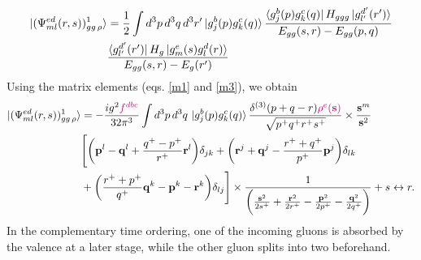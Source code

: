 \documentclass[a4paper,11pt]{article}
\def\v#1{\mathbf{#1}}
\begin{document}
\begin{figure}[htbp]
    \centering
\end{figure}
\begin{align}
\ket{(\Psi^{ed}_{ml}(r,s))^{1}_{gg\,\rho}} & = \frac{1}{2}\int d^{3}p\, d^{3}q\, d^{3}r^{\prime} \ket{g^{b}_{j}(p)g^{c}_{k}(q)}\frac{\bra{g^{b}_{j}(p)g^{c}_{k}(q)}H_{ggg}\ket{g^{d^{\prime}}_{l^{\prime}}(r^{\prime})}}{E_{gg}(s,r)-E_{gg}(p,q)}\notag \\ & \frac{\bra{g^{d^{\prime}}_{l^{\prime}}(r^{\prime})}H_{g}\ket{g^{e}_{m}(s)g^{d}_{l}(r)}}{E_{gg}(s,r)-E_{g}(r^{\prime})}
\end{align}
Using the matrix elements (eqs. \eqref{m1} and \eqref{m3}), we obtain
\begin{align}
  \ket{(\Psi^{ed}_{ml}(r,s))^{1}_{gg\,\rho}} & =  -\frac{ig^{2}{\color{chg}f^{dbc}}}{32\pi^{3}}\int d^{3}p\, d^{3}q\,\ket{g^{b}_{j}(p)g^{c}_{k}(q)} \frac{\delta^{(3)}(p+q-r){\color{chg}\rho^{e}(\v{s})}}{\sqrt{p^{+}q^{+}r^{+}s^{+}}}\times \frac{\v{s}^{m}}{\v{s}^{2}}\notag \\ & \Bigg[\bigg(\v{p}^{l}-\v{q}^{l}+\frac{q^{+}-p^{+}}{r^{+}}\v{r}^{l}\bigg)\delta_{jk} +\bigg(\v{r}^{j}+\v{q}^{j}-\frac{r^{+}+q^{+}}{p^{+}}\v{p}^{j}\bigg)\delta_{lk}\notag \\ & +\bigg(\frac{r^{+}+p^{+}}{q^{+}}\v{q}^{k}-\v{p}^{k}-\v{r}^{k}\bigg)\delta_{lj}\Bigg]\times \frac{1}{\bigg(\frac{\v{s}^2}{2s^+}+\frac{\v{r}^2}{2r^+}-\frac{\v{p}^2}{2p^+}-\frac{\v{q}^2}{2q^+}\bigg)} + s\leftrightarrow r.
\end{align}
In the complementary time ordering, one of the incoming gluons is absorbed by the valence at a later stage, while the other gluon splits into two beforehand.
\end{document}
